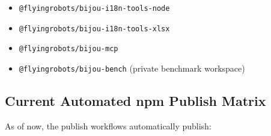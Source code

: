 \begin{itemize}
\item
  \texttt{@\allowbreak{}f\allowbreak{}l\allowbreak{}y\allowbreak{}i\allowbreak{}n\allowbreak{}g\allowbreak{}r\allowbreak{}o\allowbreak{}b\allowbreak{}o\allowbreak{}t\allowbreak{}s\allowbreak{}/\allowbreak{}b\allowbreak{}i\allowbreak{}j\allowbreak{}o\allowbreak{}u\allowbreak{}-\allowbreak{}i\allowbreak{}1\allowbreak{}8\allowbreak{}n\allowbreak{}-\allowbreak{}t\allowbreak{}o\allowbreak{}o\allowbreak{}l\allowbreak{}s\allowbreak{}-\allowbreak{}n\allowbreak{}o\allowbreak{}d\allowbreak{}e}
\item
  \texttt{@\allowbreak{}f\allowbreak{}l\allowbreak{}y\allowbreak{}i\allowbreak{}n\allowbreak{}g\allowbreak{}r\allowbreak{}o\allowbreak{}b\allowbreak{}o\allowbreak{}t\allowbreak{}s\allowbreak{}/\allowbreak{}b\allowbreak{}i\allowbreak{}j\allowbreak{}o\allowbreak{}u\allowbreak{}-\allowbreak{}i\allowbreak{}1\allowbreak{}8\allowbreak{}n\allowbreak{}-\allowbreak{}t\allowbreak{}o\allowbreak{}o\allowbreak{}l\allowbreak{}s\allowbreak{}-\allowbreak{}x\allowbreak{}l\allowbreak{}s\allowbreak{}x}
\item
  \texttt{@\allowbreak{}f\allowbreak{}l\allowbreak{}y\allowbreak{}i\allowbreak{}n\allowbreak{}g\allowbreak{}r\allowbreak{}o\allowbreak{}b\allowbreak{}o\allowbreak{}t\allowbreak{}s\allowbreak{}/\allowbreak{}b\allowbreak{}i\allowbreak{}j\allowbreak{}o\allowbreak{}u\allowbreak{}-\allowbreak{}m\allowbreak{}c\allowbreak{}p}
\item
  \texttt{@\allowbreak{}f\allowbreak{}l\allowbreak{}y\allowbreak{}i\allowbreak{}n\allowbreak{}g\allowbreak{}r\allowbreak{}o\allowbreak{}b\allowbreak{}o\allowbreak{}t\allowbreak{}s\allowbreak{}/\allowbreak{}b\allowbreak{}i\allowbreak{}j\allowbreak{}o\allowbreak{}u\allowbreak{}-\allowbreak{}b\allowbreak{}e\allowbreak{}n\allowbreak{}c\allowbreak{}h} (private benchmark workspace)
\end{itemize}

\subsection{Current Automated npm Publish Matrix}\label{record-274-current-automated-npm-publish-matrix}

As of now, the publish workflows automatically publish:

